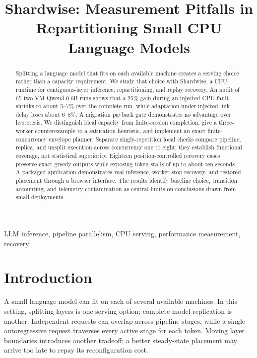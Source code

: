 \documentclass[conference]{IEEEtran}
\begin{document}
\title{Shardwise: Measurement Pitfalls in Repartitioning Small CPU
Language Models}
\author{}
\maketitle
\begin{abstract}
Splitting a language model that fits on each available machine creates a
serving choice rather than a capacity requirement. We study that choice
with Shardwise, a CPU runtime for contiguous-layer inference,
repartitioning, and replay recovery. An audit of 65 two-VM Qwen3-0.6B
runs shows that a 25\% gain during an injected CPU fault shrinks to
about 5--7\% over the complete run, while adaptation under injected link
delay loses about 6--8\%. A migration payback gate demonstrates no
advantage over hysteresis. We distinguish ideal capacity from
finite-session completion, give a three-worker counterexample to a
saturation heuristic, and implement an exact finite-concurrency envelope
planner. Separate single-repetition local checks compare pipeline,
replica, and unsplit execution across concurrency one to eight; they
establish functional coverage, not statistical superiority. Eighteen
position-controlled recovery cases preserve exact greedy outputs while
exposing token stalls of up to about ten seconds. A packaged application
demonstrates real inference, worker-stop recovery, and restored
placement through a browser interface. The results identify baseline
choice, transition accounting, and telemetry contamination as central
limits on conclusions drawn from small deployments.
\end{abstract}
\begin{IEEEkeywords}
LLM inference, pipeline parallelism, CPU serving, performance
measurement, recovery
\end{IEEEkeywords}
\hypertarget{introduction}{%
\section{Introduction}\label{introduction}}

A small language model can fit on each of several available machines. In
this setting, splitting layers is one serving option; complete-model
replication is another. Independent requests can overlap across pipeline
stages, while a single autoregressive request traverses every active
stage for each token. Moving layer boundaries introduces another
tradeoff: a better steady-state placement may arrive too late to repay
its reconfiguration cost.
\end{document}
